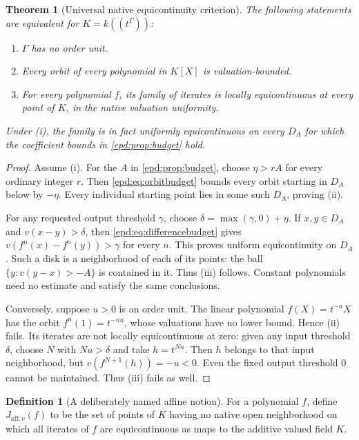 \documentclass[11pt,a4paper]{article}
\numberwithin{equation}{section}
\newtheorem{theorem}{Theorem}[section]
\theoremstyle{plain}
\theoremstyle{definition}
\newtheorem{definition}[definition]{Definition}
\theoremstyle{remark}
\begin{document}
\begin{theorem}[Universal native equicontinuity criterion]
\label{epd:thm:general}
The following statements are equivalent for $K=k((t^\Gamma))$:
\begin{enumerate}[label=\textup{(\roman*)},leftmargin=2em]
\item $\Gamma$ has no order unit.
\item Every orbit of every polynomial in $K[X]$ is valuation-bounded.
\item For every polynomial $f$, its family of iterates is locally
equicontinuous at every point of $K$, in the native valuation uniformity.
\end{enumerate}
Under (i), the family is in fact uniformly equicontinuous on every
$D_A$ for which the coefficient bounds in \cref{epd:prop:budget} hold.
\end{theorem}
\begin{proof}
Assume (i). For the $A$ in \cref{epd:prop:budget}, choose
$\eta>rA$ for every ordinary integer $r$. Then
\eqref{epd:eq:orbitbudget} bounds every orbit starting in $D_A$ below by
$-\eta$. Every individual starting point lies in some such $D_A$,
proving (ii).

For any requested output threshold $\gamma$, choose
$\delta=\max(\gamma,0)+\eta$. If $x,y\in D_A$ and
$v(x-y)>\delta$, then \eqref{epd:eq:differencebudget} gives
$v(f^n(x)-f^n(y))>\gamma$ for every $n$. This proves uniform
equicontinuity on $D_A$. Such a disk is a neighborhood of each of its
points: the ball $\{y:v(y-x)>-A\}$ is contained in it. Thus (iii)
follows. Constant polynomials need no estimate and satisfy the same
conclusions.

Conversely, suppose $u>0$ is an order unit. The linear polynomial
$f(X)=t^{-u}X$ has the orbit $f^n(1)=t^{-nu}$, whose valuations have
no lower bound. Hence (ii) fails. Its iterates are not locally
equicontinuous at zero: given any input threshold $\delta$, choose
$N$ with $Nu>\delta$ and take $h=t^{Nu}$. Then $h$ belongs to that
input neighborhood, but $v(f^{N+1}(h))=-u<0$. Even the fixed output
threshold $0$ cannot be maintained. Thus (iii) fails as well.
\end{proof}

\begin{definition}[A deliberately named affine notion]\label{epd:def:affine-julia}
For a polynomial $f$, define $J_{\mathrm{aff},v}(f)$ to be the set of
points of $K$ having no native open neighborhood on which all iterates
of $f$ are equicontinuous as maps to the additive valued field $K$.
\end{definition}
\end{document}

